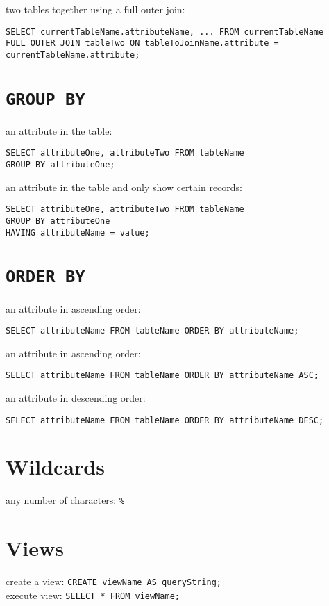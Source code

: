 \documentclass[a4paper,11pt]{article}
\begin{document}
two tables together using a full outer join:
\begin{verbatim}
SELECT currentTableName.attributeName, ... FROM currentTableName
FULL OUTER JOIN tableTwo ON tableToJoinName.attribute = currentTableName.attribute;
\end{verbatim}

\section{\texttt{GROUP BY}}
an attribute in the table:
\begin{verbatim}
SELECT attributeOne, attributeTwo FROM tableName
GROUP BY attributeOne;
\end{verbatim}
an attribute in the table and only show certain records:
\begin{verbatim}
SELECT attributeOne, attributeTwo FROM tableName
GROUP BY attributeOne
HAVING attributeName = value;
\end{verbatim}

\section{\texttt{ORDER BY}}
an attribute in ascending order: 
\begin{verbatim}
SELECT attributeName FROM tableName ORDER BY attributeName;
\end{verbatim}

an attribute in ascending order:
\begin{verbatim}
SELECT attributeName FROM tableName ORDER BY attributeName ASC;
\end{verbatim}

an attribute in descending order:
\begin{verbatim}
SELECT attributeName FROM tableName ORDER BY attributeName DESC;
\end{verbatim}

\section{Wildcards}
any number of characters: \verb|%|

\section{Views}
create a view: \verb|CREATE viewName AS queryString;|\\
execute view: \verb|SELECT * FROM viewName;|
\end{document}
